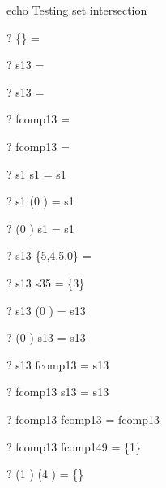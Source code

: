 echo     Testing set intersection
\begin{zed} \vdash?  \{\}      \cap \emptyset   = \emptyset \end{zed}
\begin{zed} \vdash?  \emptyset \cap s13         = \emptyset \end{zed}
\begin{zed} \vdash?  s13       \cap \emptyset   = \emptyset \end{zed}
\begin{zed} \vdash?  \emptyset \cap fcomp13     = \emptyset \end{zed}
\begin{zed} \vdash?  fcomp13   \cap \emptyset   = \emptyset \end{zed}
\begin{zed} \vdash?  s1        \cap s1          = s1 \end{zed}
\begin{zed} \vdash?  s1        \cap (0 ) = s1 \end{zed}
\begin{zed} \vdash?  (0 ) \cap s1        = s1 \end{zed}
\begin{zed} \vdash?  s13       \cap \{5,4,5,0\} = \emptyset \end{zed}
\begin{zed} \vdash?  s13       \cap s35         = \{3\} \end{zed}
\begin{zed} \vdash?  s13       \cap (0 ) = s13 \end{zed}
\begin{zed} \vdash?  (0 ) \cap s13       = s13 \end{zed}
\begin{zed} \vdash?  s13       \cap fcomp13     = s13 \end{zed}
\begin{zed} \vdash?  fcomp13   \cap s13         = s13 \end{zed}
\begin{zed} \vdash?  fcomp13   \cap fcomp13     = fcomp13 \end{zed}
\begin{zed} \vdash?  fcomp13   \cap fcomp149    = \{1\} \end{zed}
\begin{zed} \vdash?  (1 ) \cap (4 ) = \{\} \end{zed}
